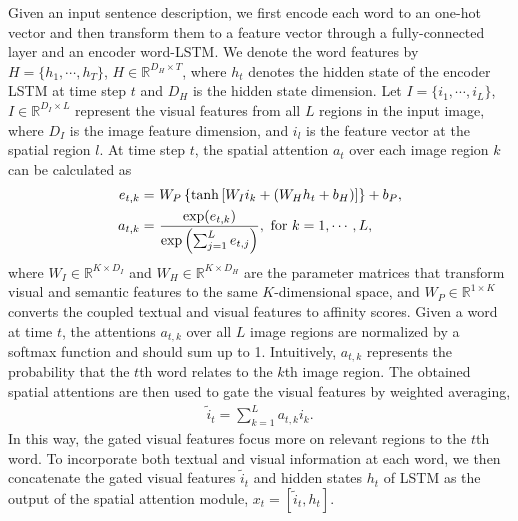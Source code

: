 Given an input sentence description, we first encode each word to an one-hot vector and then transform them to a feature vector through a fully-connected layer and an encoder word-LSTM. We denote the word features by $H={\{h_1, \cdots ,h_T\}}$, $H \in \mathbb{R}^{D_H \times T}$, where $h_t$ denotes the hidden state of the encoder LSTM at time step $t$ and $D_H$ is the hidden state dimension. Let $I = {\{i_1, \cdots ,i_L\}}$, $I \in \mathbb{R}^{D_I \times L}$ represent the visual features from all $L$ regions in the input image, where $D_I$ is the image feature dimension, and $i_l$ is the feature vector at the spatial region $l$. At time step $t$, the spatial attention $a_t$ over each image region $k$ can be calculated as
\begin{align}
e_{t,k} = &\,\,W_P\left\{ \tanh\left[W_I i_k + (W_H h_t + b_H) \right] \right\} + b_P,\\
a_{t,k} = & \,\, \frac{\exp(e_{t,k})}{\exp\left(\sum_{j=1}^L e_{t,j}\right)}, \textnormal{  for $k= 1, \cdots, L$},
\end{align}
where $W_I \in \mathbb{R}^{K\times D_I}$ and $W_H \in \mathbb{R}^{K \times D_H}$ are the parameter matrices that transform visual and semantic features to the same $K$-dimensional space, and $W_P \in \mathbb{R}^{1 \times K}$ converts the coupled textual and visual features to affinity scores. Given a word at time $t$, the attentions $a_{t,k}$ over all $L$ image regions are normalized by a softmax function and should sum up to 1.
Intuitively, $a_{t,k}$ represents the probability that the $t$th word relates to the $k$th image region.
The obtained spatial attentions are then used to gate the visual features by weighted averaging,
\begin{align}
\tilde{i}_t = \sum_{k=1}^{L}{a_{t,k} i_k}.
\end{align}
In this way, the gated visual features focus more on relevant regions to the $t$th word.
To incorporate both textual and visual information at each word, we then concatenate the gated visual features $\tilde{i}_t$ and hidden states $h_t$ of LSTM as the output of the spatial attention module, $x_t = \left[\tilde{i}_t, h_t\right]$.

